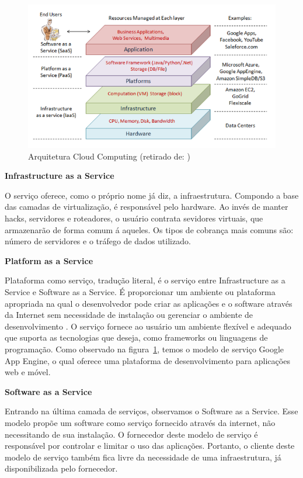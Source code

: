 \documentclass[12pt]{article}
\begin{document}
\begin{figure}[ht]
\centering
\includegraphics[width=.9\textwidth]{architeture.png}
\caption{Arquitetura Cloud Computing (retirado de: \cite{2})}
\label{fig:architeture}
\end{figure}

\textbf{Infrastructure as a Service}

O serviço oferece, como o próprio nome já diz, a infraestrutura. Compondo a base das camadas de virtualização, é responsável pelo hardware.
Ao invés de manter hacks, servidores e roteadores, o usuário contrata sevidores virtuais, que armazenarão de forma comum á aqueles. Os tipos de cobrança mais comuns são: número de servidores e o tráfego de dados utilizado.

\textbf{Platform as a Service}

Plataforma como serviço, tradução literal, é o serviço entre Infrastructure as a Service e Software as a Service. É proporcionar um ambiente ou plataforma apropriada na qual o desenvolvedor pode criar as aplicações e o software através da Internet sem necessidade de instalação ou gerenciar o ambiente de desenvolvimento \cite{1}. O serviço fornece ao usuário um ambiente flexível e adequado que suporta as tecnologias que deseja, como frameworks ou linguagens de programação. Como observado na figura~\ref{fig:architeture}, temos o modelo de serviço Google App Engine, o qual oferece uma plataforma de desenvolvimento para aplicações web e móvel.

\textbf{Software as a Service}

Entrando na última camada de serviços, observamos o Software as a Service. Esse modelo propõe um software como serviço fornecido através da internet, não necessitando de sua instalação. O fornecedor deste modelo de serviço é responsável por controlar e limitar o uso das aplicações. Portanto, o cliente deste modelo de serviço também fica livre da necessidade de uma infraestrutura, já disponibilizada pelo fornecedor.
\end{document}
